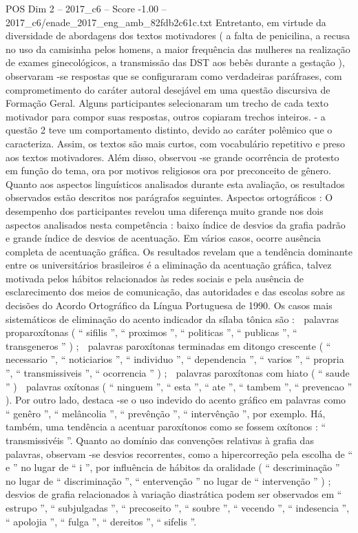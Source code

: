 \begin{textsample}{POS Dim 2 – 2017\_c6 – Score -1.00 – 2017\_c6/enade\_2017\_eng\_amb\_82fdb2c61c.txt}
Entretanto, em virtude da diversidade de abordagens dos textos motivadores ( a falta de penicilina, a recusa no uso da camisinha pelos homens, a maior frequência das mulheres na realização de exames ginecológicos, a transmissão das DST aos bebês durante a gestação ), observaram -se respostas que se configuraram como verdadeiras paráfrases, com comprometimento do caráter autoral desejável em uma questão discursiva de Formação Geral.
Alguns participantes selecionaram um trecho de cada texto motivador para compor suas respostas, outros copiaram trechos inteiros. - a questão 2 teve um comportamento distinto, devido ao caráter polêmico que o caracteriza.
Assim, os textos são mais curtos, com vocabulário repetitivo e preso aos textos motivadores.
Além disso, observou -se grande ocorrência de protesto em função do tema, ora por motivos religiosos ora por preconceito de gênero.
Quanto aos aspectos linguísticos analisados durante esta avaliação, os resultados observados estão descritos nos parágrafos seguintes.
Aspectos ortográficos : O desempenho dos participantes revelou uma diferença muito grande nos dois aspectos analisados nesta competência : baixo índice de desvios da grafia padrão e grande índice de desvios de acentuação.
Em vários casos, ocorre ausência completa de acentuação gráfica.
Os resultados revelam que a tendência dominante entre os universitários brasileiros é a eliminação da acentuação gráfica, talvez motivada pelos hábitos relacionados às redes sociais e pela ausência de esclarecimento dos meios de comunicação, das autoridades e das escolas sobre as decisões do Acordo Ortográfico da Língua Portuguesa de 1990.
Os casos mais sistemáticos de eliminação do acento indicador da sílaba tônica são :  palavras proparoxítonas ( “ sifilis ”, “ proximos ”, “ politicas ”, “ publicas ”, “ transgeneros ” ) ;  palavras paroxítonas terminadas em ditongo crescente ( “ necessario ”, “ noticiarios ”, “ individuo ”, “ dependencia ”, “ varios ”, “ propria ”, “ transmissiveis ”, “ ocorrencia ” ) ;  palavras paroxítonas com hiato ( “ saude ” )  palavras oxítonas ( “ ninguem ”, “ esta ”, “ ate ”, “ tambem ”, “ prevencao ” ).
Por outro lado, destaca -se o uso indevido do acento gráfico em palavras como “ genêro ”, “ melâncolia ”, “ prevênção ”, “ intervênção ”, por exemplo.
Há, também, uma tendência a acentuar paroxítonos como se fossem oxítonos : “ transmissivéis ”.
Quanto ao domínio das convenções relativas à grafia das palavras, observam -se desvios recorrentes, como a hipercorreção pela escolha de “ e ” no lugar de “ i ”, por influência de hábitos da oralidade ( “ descriminação ” no lugar de “ discriminação ”, “ entervenção ” no lugar de “ intervenção ” ) ; desvios de grafia relacionados à variação diastrática podem ser observados em “ estrupo ”, “ subjulgadas ”, “ precoseito ”, “ soubre ”, “ vecendo ”, “ indesencia ”, “ apolojia ”, “ fulga ”, “ dereitos ”, “ sifelis ”.

\end{textsample}
